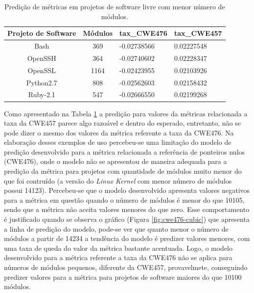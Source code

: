 \begin{table}[h]
 \centering
 \begin{tabular}{ccll}
  \hline
  \rowcolor[HTML]{EFEFEF} 
  Projeto de Software & Módulos &
  \multicolumn{1}{c}{\cellcolor[HTML]{EFEFEF}tax\_CWE476} &
  \multicolumn{1}{c}{\cellcolor[HTML]{EFEFEF}tax\_CWE457} \\ \hline
  Bash                & 369     & -0.02738566
  & 0.02227548                                              \\ \hline
  OpenSSH             & 364     & -0.02740602
  & 0.02228347                                              \\ \hline
  OpenSSL             & 1164    & -0.02423955
  & 0.02103926                                              \\ \hline
  Python2.7           & 808     & -0.02562603
  & 0.02158432                                              \\ \hline
  Ruby-2.1            & 547     & -0.02666550
  & 0.02199268                                             \\ \hline
 \end{tabular}
 \caption{Predição de métricas em projetos de software livre com menor número
 de módulos.}
 \label{tab:exemplos}
\end{table}



Como apresentado na Tabela \ref{tab:exemplos} a predição para valores da
métricas relacionada a taxa da CWE457 parece algo razoável e dentro do esperado,
entretanto, não se pode dizer o mesmo dos valores da métrica referente a taxa da
CWE476. Na elaboração desses exemplos de uso percebeu-se uma limitação do
modelo de predição desenvolvido para a métrica relacionada a referência de
ponteiros nulos (CWE476), onde o modelo não se apresentou de maneira adequada
para a predição da métrica para projetos com quantidade de módulos muito menor
do que foi contruído (a versão do \textit{Linux Kernel} com menor número de
módulos possui 14123). Percebeu-se que o modelo desenvolvido apresenta valores
negativos para a métrica em questão quando o número de módulos é menor do que
10105, sendo que a métrica não aceita valores menores do que zero. Esse
comportamento é justificado quando se observa o gráfico (Figura
\ref{fig:cwe476-cubic}) que apresenta a linha de predição do modelo, pode-se ver
que quanto menor o número de módulos a partir de 14234 a tendência do modelo é
predizer valores menores, com uma taxa de queda do valor da métrica bastante
acentuada. Logo, o modelo desenvolvido para a métrica referente a taxa da CWE476
não se aplica para números de módulos pequenos, diferente da CWE457,
provavelmete, conseguindo predizer valores para a métrica para projetos de
software maiores do que 10100 módulos.

